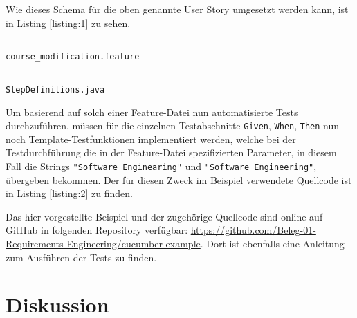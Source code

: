 \documentclass[acmtog]{acmart}
\begin{document}
\vspace*{-1em}
Wie dieses Schema für die oben genannte User Story umgesetzt werden kann, ist in Listing \ref{listing:1} zu sehen.

\begin{listing}[!h]
	\begin{tcolorbox}[colframe=black, colback=white, opacityback=1.0, sharp corners, boxrule=.4pt, width=\linewidth]
		\vspace*{-.6em}
		\inputminted[xleftmargin=-12pt, xrightmargin=-18pt]{cucumber}{cucumber/course_modification.feature}
		\vspace*{-1em}
	\end{tcolorbox}
	\vspace*{-1em}
	\caption{\texttt{course\_modification.feature}}
	\label{listing:1}
\end{listing}


\begin{listing}[!h]
	\begin{tcolorbox}[colframe=black, colback=white, opacityback=1.0, sharp corners, boxrule=.4pt, width=\linewidth-.8pt]
		\vspace{-.6em}
		\inputminted[linenos, firstline=9, breakafter=_, xleftmargin=2pt, numbersep=6pt, frame=none]{java}{cucumber/StepDefinitions.java}
		\vspace{-1em}
	\end{tcolorbox}
	\vspace{-1em}
	\caption{\texttt{StepDefinitions.java}}
	\label{listing:2}
\end{listing}

Um basierend auf solch einer Feature-Datei nun automatisierte Tests durchzuführen, müssen für die einzelnen Testabschnitte
\texttt{Given}, \texttt{When}, \texttt{Then} nun noch Template-Testfunktionen implementiert werden, welche bei der Testdurchführung
die in der Feature-Datei spezifizierten Parameter, in diesem Fall die Strings \texttt{"Software Enginearing"} und
\texttt{"Software Engineering"}, übergeben bekommen.
Der für diesen Zweck im Beispiel verwendete Quellcode ist in Listing \ref{listing:2} zu finden.

Das hier vorgestellte Beispiel und der zugehörige Quellcode sind online auf GitHub in folgenden Repository verfügbar:
\url{https://github.com/Beleg-01-Requirements-Engineering/cucumber-example}.
Dort ist ebenfalls eine Anleitung zum Ausführen der Tests zu finden.


\section{Diskussion} \label{sec:diskussion}
\end{document}
